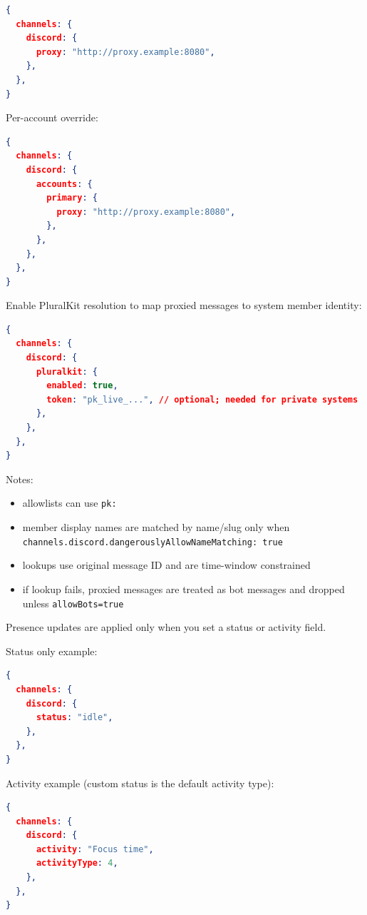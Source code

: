 \begin{lstlisting}[language=json]
{
  channels: {
    discord: {
      proxy: "http://proxy.example:8080",
    },
  },
}
\end{lstlisting}


Per-account override:

\begin{lstlisting}[language=json]
{
  channels: {
    discord: {
      accounts: {
        primary: {
          proxy: "http://proxy.example:8080",
        },
      },
    },
  },
}
\end{lstlisting}



Enable PluralKit resolution to map proxied messages to system member identity:

\begin{lstlisting}[language=json]
{
  channels: {
    discord: {
      pluralkit: {
        enabled: true,
        token: "pk_live_...", // optional; needed for private systems
      },
    },
  },
}
\end{lstlisting}


Notes:

\begin{itemize}
  \item allowlists can use \texttt{pk:}
  \item member display names are matched by name/slug only when \texttt{channels.discord.dangerouslyAllowNameMatching: true}
  \item lookups use original message ID and are time-window constrained
  \item if lookup fails, proxied messages are treated as bot messages and dropped unless \texttt{allowBots=true}
\end{itemize}



Presence updates are applied only when you set a status or activity field.

Status only example:

\begin{lstlisting}[language=json]
{
  channels: {
    discord: {
      status: "idle",
    },
  },
}
\end{lstlisting}


Activity example (custom status is the default activity type):

\begin{lstlisting}[language=json]
{
  channels: {
    discord: {
      activity: "Focus time",
      activityType: 4,
    },
  },
}
\end{lstlisting}


